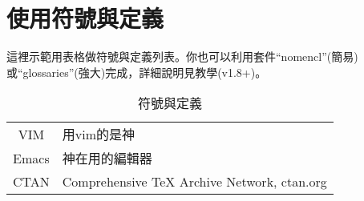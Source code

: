 \documentclass[class=NCNU_thesis, crop=false]{standalone}
\begin{document}
\chapter{使用符號與定義}
這裡示範用表格做符號與定義列表。你也可以利用套件``nomencl''(簡易)或``glossaries''(強大)完成，詳細說明見教學(v1.8+)。

\begin{table}[h]
    \normalsize %
    \centering
    \begin{tabular}{c@{\quad：}l}
        VIM     & 用vim的是神 \\ 
        Emacs   & 神在用的編輯器 \\ 
        CTAN    & Comprehensive TeX Archive Network, ctan.org \\
        
    \end{tabular} 
    \caption*{符號與定義} %
    \label{table:symbol_def}
\end{table}
\end{document}
